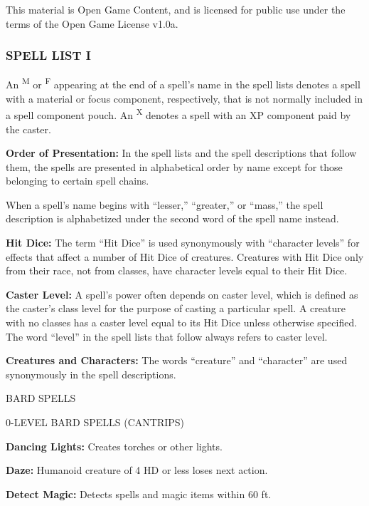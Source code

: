 \documentclass{article}
\begin{document}
This material is Open Game Content, and is licensed for public use under the terms 
of the Open Game License v1.0a.

\subsubsection*{{\LARGE{}SPELL LIST I}}

\vspace{12pt}
An \textsuperscript{M}{\scriptsize{} }or \textsuperscript{F}{\scriptsize{} }appearing 
at the end of a spell's name in the spell lists denotes a spell with a material 
or focus component, respectively, that is not normally included in a spell component 
pouch. An \textsuperscript{X}{\scriptsize{} }denotes a spell with an XP component 
paid by the caster.

\textbf{Order of Presentation: }In the spell lists and the spell descriptions that 
follow them, the spells are presented in alphabetical order by name except for 
those belonging to certain spell chains.

When a spell's name begins with ``lesser,'' ``greater,'' or ``mass,'' the spell 
description is alphabetized under the second word of the spell name instead.

\textbf{Hit Dice: }The term ``Hit Dice'' is used synonymously with ``character 
levels'' for effects that affect a number of Hit Dice of creatures. Creatures with 
Hit Dice only from their race, not from classes, have character levels equal to 
their Hit Dice.

\textbf{Caster Level:} A spell's power often depends on caster level, which is 
defined as the caster's class level for the purpose of casting a particular spell. 
A creature with no classes has a caster level equal to its Hit Dice unless otherwise 
specified. The word ``level'' in the spell lists that follow always refers to caster 
level.

\textbf{Creatures and Characters: }The words ``creature'' and ``character'' are 
used synonymously in the spell descriptions.

\vspace{12pt}
{\LARGE{}BARD SPELLS}

0-LEVEL BARD SPELLS (CANTRIPS)

\textbf{Dancing Lights:} Creates torches or other lights.

\textbf{Daze:} Humanoid creature of 4 HD or less loses next action.

\textbf{Detect Magic:} Detects spells and magic items within 60 ft.
\end{document}
